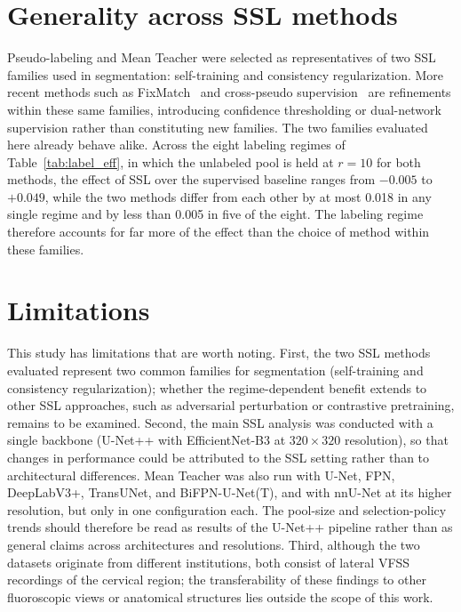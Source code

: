 \documentclass[
  msc,
  american
]{ThesisPUC_v2}
\begin{document}
\section{Generality across SSL methods}
\label{sec:results-scope}

Pseudo-labeling and Mean Teacher were selected as representatives of two SSL families used in segmentation: self-training and consistency regularization. More recent methods such as FixMatch~\citep{ref_fixmatch} and cross-pseudo supervision~\citep{ref_cps} are refinements within these same families, introducing confidence thresholding or dual-network supervision rather than constituting new families. The two families evaluated here already behave alike. Across the eight labeling regimes of Table~\ref{tab:label_eff}, in which the unlabeled pool is held at $r=10$ for both methods, the effect of SSL over the supervised baseline ranges from $-0.005$ to $+0.049$, while the two methods differ from each other by at most 0.018 in any single regime and by less than 0.005 in five of the eight. The labeling regime therefore accounts for far more of the effect than the choice of method within these families.

\section{Limitations}
\label{sec:results-limits}

This study has limitations that are worth noting. First, the two SSL methods evaluated represent two common families for segmentation (self-training and consistency regularization); whether the regime-dependent benefit extends to other SSL approaches, such as adversarial perturbation or contrastive pretraining, remains to be examined. Second, the main SSL analysis was conducted with a single backbone (U-Net++ with EfficientNet-B3 at $320 \times 320$ resolution), so that changes in performance could be attributed to the SSL setting rather than to architectural differences. Mean Teacher was also run with U-Net, FPN, DeepLabV3+, TransUNet, and BiFPN-U-Net(T), and with nnU-Net at its higher resolution, but only in one configuration each. The pool-size and selection-policy trends should therefore be read as results of the U-Net++ pipeline rather than as general claims across architectures and resolutions. Third, although the two datasets originate from different institutions, both consist of lateral VFSS recordings of the cervical region; the transferability of these findings to other fluoroscopic views or anatomical structures lies outside the scope of this work.
\end{document}
